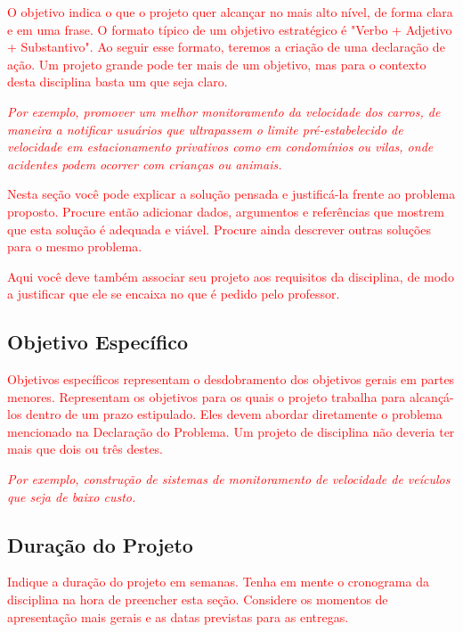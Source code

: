 \textcolor{red}{O objetivo indica o que o projeto quer alcançar no mais alto nível, de forma clara e em uma frase. O formato típico de um objetivo estratégico é "Verbo + Adjetivo + Substantivo". Ao seguir esse formato, teremos a criação de uma declaração de ação. Um projeto grande pode ter mais de um objetivo, mas para o contexto desta disciplina basta um que seja claro.}

\textcolor{red}{\textit{Por exemplo, promover um melhor monitoramento da velocidade dos carros, de maneira a notificar usuários que ultrapassem o limite pré-estabelecido de velocidade em estacionamento privativos como em condomínios ou vilas, onde acidentes podem ocorrer com crianças ou animais.}}

\textcolor{red}{Nesta seção você pode explicar a solução pensada e justificá-la frente ao problema proposto. Procure então adicionar dados, argumentos e referências que mostrem que esta solução é adequada e viável. Procure ainda descrever outras soluções para o mesmo problema.}

\textcolor{red}{Aqui você deve também associar seu projeto aos requisitos da disciplina, de modo a justificar que ele se encaixa no que é pedido pelo professor.}

\subsection{Objetivo Específico}

\textcolor{red}{Objetivos específicos representam o desdobramento dos objetivos gerais em partes menores. Representam os objetivos para os quais o projeto trabalha para alcançá-los dentro de um prazo estipulado. Eles devem abordar diretamente o problema mencionado na Declaração do Problema. Um projeto de disciplina não deveria ter mais que dois ou três destes.}

\textcolor{red}{\textit{Por exemplo, construção de sistemas de monitoramento de velocidade de veículos que seja de baixo custo.}}

\subsection{Duração do Projeto}

\textcolor{red}{Indique a duração do projeto em semanas. Tenha em mente o cronograma da disciplina na hora de preencher esta seção. Considere os momentos de apresentação mais gerais e as datas previstas para as entregas.}
